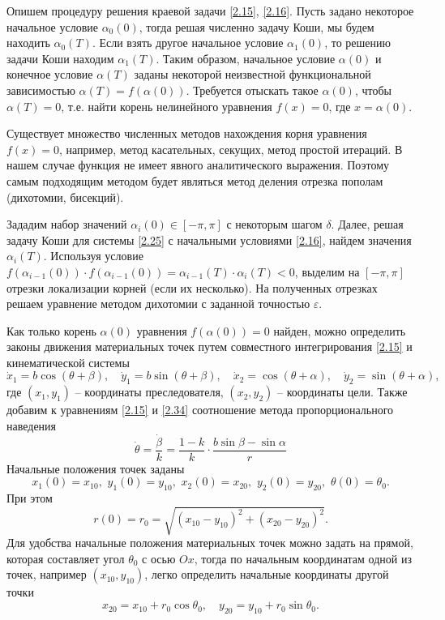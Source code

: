 \documentclass[a4paper,12pt, openany]{book}
\theoremstyle{plain} %
\theoremstyle{definition} %
\theoremstyle{remark} %
\numberwithin{equation}{chapter}
\begin{document}
{Опишем процедуру решения краевой задачи \eqref{2.15}, \eqref{2.16}. Пусть задано некоторое начальное условие $\alpha_0(0)$, тогда решая численно задачу Коши, мы будем находить $\alpha_0(T)$. 
Если взять другое начальное условие $\alpha_1(0)$, то решению задачи Коши находим $\alpha_1(T)$. Таким образом, начальное условие $\alpha(0)$ и конечное условие $\alpha(T)$ заданы некоторой неизвестной функциональной зависимостью $\alpha(T) = f(\alpha(0))$. Требуется отыскать такое $\alpha(0)$, чтобы $\alpha(T) = 0$, т.е. найти корень нелинейного уравнения $f(x) = 0$, где $x = \alpha(0)$.



Существует множество численных методов нахождения корня уравнения $f(x) = 0$, например, метод касательных, секущих, метод простой итераций. В нашем случае функция не имеет явного аналитического выражения. Поэтому самым подходящим методом будет являться метод деления отрезка пополам (дихотомии, бисекций).  

Зададим набор значений $\alpha_i(0) \in [-\pi,\pi]$ с некоторым шагом $\delta$. Далее, решая задачу Коши для системы \eqref{2.25} с начальными условиями \eqref{2.16}, найдем значения $\alpha_i(T)$. Используя условие $f(\alpha_{i-1}(0))\cdot f(\alpha_{i-1}(0)) = \alpha_{i-1}(T)\cdot\alpha_i(T) < 0$, выделим на $[-\pi,\pi]$ отрезки локализации корней (если их несколько). На полученных отрезках решаем уравнение методом дихотомии с заданной точностью $\varepsilon$. 

Как только корень $\alpha(0)$ уравнения $f(\alpha(0)) = 0$ найден, можно определить законы движения материальных точек путем совместного интегрирования \eqref{2.15} и кинематической системы 
\begin{equation}\label{2.34}
\dot x_1  = b\cos \left( {\theta  + \beta } \right),\quad \dot y_1  = b\sin \left( {\theta  + \beta } \right), \quad \dot x_2  = \cos \left( {\theta  + \alpha } \right),\quad \dot y_2  = \sin \left( {\theta  + \alpha } \right),
\end{equation}
где $(x_1,y_1)$ -- координаты преследователя, $(x_2,y_2)$ -- координаты цели. Также добавим к уравнениям \eqref{2.15} и \eqref{2.34} соотношение метода пропорционального наведения 
\begin{equation}\label{2.35}
\dot \theta  = \frac{{\dot \beta }}{k} = \frac{{1 - k}}{k} \cdot \frac{{b\sin \beta  - \sin \alpha }}{r}
\end{equation}
Начальные положения точек заданы
\begin{equation}\label{2.36}
x_1 \left( 0 \right) = x_{10} ,\,\,y_1 \left( 0 \right) = y_{10} ,\,\,x_2 \left( 0 \right) = x_{20} ,\,\,y_2 \left( 0 \right) = y_{20} ,\,\,\theta \left( 0 \right) = \theta _0 .
\end{equation}
При этом
\[
r(0) = r_0  = \sqrt {\left( {x_{10}  - y_{10} } \right)^2  + \left( {x_{20}  - y_{20} } \right)^2 } .
\]
Для удобства начальные положения материальных точек можно задать на прямой, которая составляет угол $\theta_0$ с осью $Ox$, тогда по начальным координатам одной из точек, например $(x_{10}, y_{10})$, легко определить начальные координаты другой точки
\[
x_{20}  = x_{10}  + r_0 \cos \theta _0 ,\quad y_{20}  = y_{10}  + r_0 \sin \theta _0 .
\]

}
\end{document}

